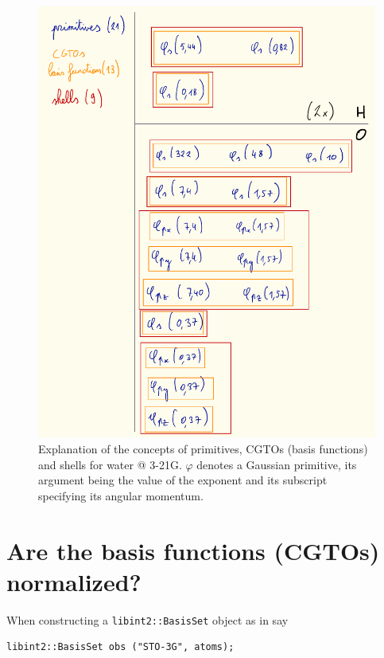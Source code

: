 \documentclass[12pt]{article}
\begin{document}
    \begin{figure}[H]
        \centering
        \includegraphics[scale=0.65]{figures/H2O_3-21g.pdf}
        \caption{Explanation of the concepts of primitives, CGTOs (basis functions) and shells for water @ 3-21G. $\varphi$ denotes a Gaussian primitive, its argument being the value of the exponent and its subscript specifying its angular momentum.}
        \label{fig:basis}
    \end{figure}


\section{Are the basis functions (CGTOs) normalized?}

    When constructing a \lstinline{libint2::BasisSet} object as in say

\begin{lstlisting}
libint2::BasisSet obs ("STO-3G", atoms);
\end{lstlisting}
\end{document}
